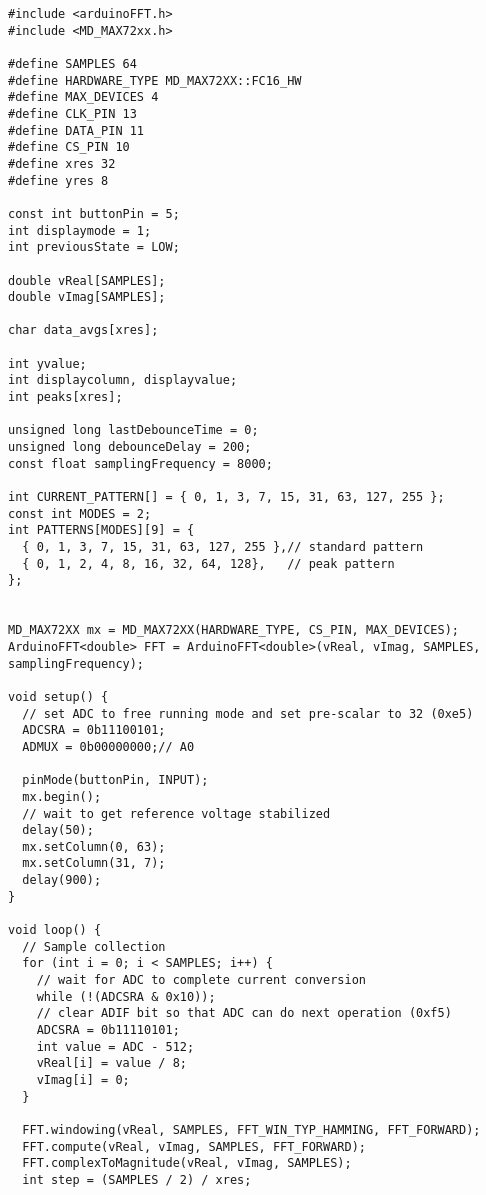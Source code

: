 \documentclass[12pt, a4paper]{article}
\begin{document}
\vspace*{1cm}

\renewcommand{\theFancyVerbLine}{\textcolor[rgb]{0.5,0.5,1.0}{\scriptsize \arabic{FancyVerbLine}}}
\begin{verbatim}
#include <arduinoFFT.h>
#include <MD_MAX72xx.h>

#define SAMPLES 64
#define HARDWARE_TYPE MD_MAX72XX::FC16_HW
#define MAX_DEVICES 4
#define CLK_PIN 13
#define DATA_PIN 11
#define CS_PIN 10
#define xres 32
#define yres 8

const int buttonPin = 5;
int displaymode = 1;
int previousState = LOW;

double vReal[SAMPLES];
double vImag[SAMPLES];

char data_avgs[xres];

int yvalue;
int displaycolumn, displayvalue;
int peaks[xres];

unsigned long lastDebounceTime = 0;
unsigned long debounceDelay = 200;
const float samplingFrequency = 8000;

int CURRENT_PATTERN[] = { 0, 1, 3, 7, 15, 31, 63, 127, 255 };
const int MODES = 2;
int PATTERNS[MODES][9] = {
  { 0, 1, 3, 7, 15, 31, 63, 127, 255 },// standard pattern
  { 0, 1, 2, 4, 8, 16, 32, 64, 128},   // peak pattern
};


MD_MAX72XX mx = MD_MAX72XX(HARDWARE_TYPE, CS_PIN, MAX_DEVICES);
ArduinoFFT<double> FFT = ArduinoFFT<double>(vReal, vImag, SAMPLES, samplingFrequency);

void setup() {
  // set ADC to free running mode and set pre-scalar to 32 (0xe5)
  ADCSRA = 0b11100101;
  ADMUX = 0b00000000;// A0

  pinMode(buttonPin, INPUT);
  mx.begin();
  // wait to get reference voltage stabilized
  delay(50);
  mx.setColumn(0, 63);
  mx.setColumn(31, 7);
  delay(900);
}

void loop() {
  // Sample collection
  for (int i = 0; i < SAMPLES; i++) {
    // wait for ADC to complete current conversion
    while (!(ADCSRA & 0x10));
    // clear ADIF bit so that ADC can do next operation (0xf5)
    ADCSRA = 0b11110101;
    int value = ADC - 512;
    vReal[i] = value / 8;
    vImag[i] = 0;
  }

  FFT.windowing(vReal, SAMPLES, FFT_WIN_TYP_HAMMING, FFT_FORWARD);
  FFT.compute(vReal, vImag, SAMPLES, FFT_FORWARD);
  FFT.complexToMagnitude(vReal, vImag, SAMPLES);
  int step = (SAMPLES / 2) / xres;


\end{verbatim}
\end{document}
